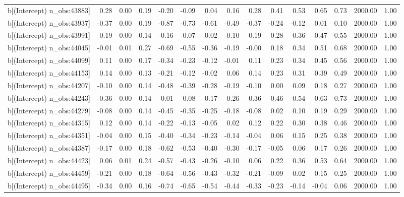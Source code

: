 \begin{table}[ht]
\begin{tabular}{rrrrrrrrrrrrrrr}
  b[(Intercept) n\_obs:43883] & 0.28 & 0.00 & 0.19 & -0.20 & -0.09 & 0.04 & 0.16 & 0.28 & 0.41 & 0.53 & 0.65 & 0.73 & 2000.00 & 1.00 \\ 
  b[(Intercept) n\_obs:43937] & -0.37 & 0.00 & 0.19 & -0.87 & -0.73 & -0.61 & -0.49 & -0.37 & -0.24 & -0.12 & 0.01 & 0.10 & 2000.00 & 1.00 \\ 
  b[(Intercept) n\_obs:43991] & 0.19 & 0.00 & 0.14 & -0.16 & -0.07 & 0.02 & 0.10 & 0.19 & 0.28 & 0.36 & 0.47 & 0.55 & 2000.00 & 1.00 \\ 
  b[(Intercept) n\_obs:44045] & -0.01 & 0.01 & 0.27 & -0.69 & -0.55 & -0.36 & -0.19 & -0.00 & 0.18 & 0.34 & 0.51 & 0.68 & 2000.00 & 1.00 \\ 
  b[(Intercept) n\_obs:44099] & 0.11 & 0.00 & 0.17 & -0.34 & -0.23 & -0.12 & -0.01 & 0.11 & 0.23 & 0.34 & 0.45 & 0.56 & 2000.00 & 1.00 \\ 
  b[(Intercept) n\_obs:44153] & 0.14 & 0.00 & 0.13 & -0.21 & -0.12 & -0.02 & 0.06 & 0.14 & 0.23 & 0.31 & 0.39 & 0.49 & 2000.00 & 1.00 \\ 
  b[(Intercept) n\_obs:44207] & -0.10 & 0.00 & 0.14 & -0.48 & -0.39 & -0.28 & -0.19 & -0.10 & 0.00 & 0.09 & 0.18 & 0.27 & 2000.00 & 1.00 \\ 
  b[(Intercept) n\_obs:44243] & 0.36 & 0.00 & 0.14 & 0.01 & 0.08 & 0.17 & 0.26 & 0.36 & 0.46 & 0.54 & 0.63 & 0.73 & 2000.00 & 1.00 \\ 
  b[(Intercept) n\_obs:44279] & -0.08 & 0.00 & 0.14 & -0.45 & -0.35 & -0.25 & -0.18 & -0.08 & 0.02 & 0.10 & 0.19 & 0.29 & 2000.00 & 1.00 \\ 
  b[(Intercept) n\_obs:44315] & 0.12 & 0.00 & 0.14 & -0.22 & -0.13 & -0.05 & 0.02 & 0.12 & 0.22 & 0.30 & 0.38 & 0.46 & 2000.00 & 1.00 \\ 
  b[(Intercept) n\_obs:44351] & -0.04 & 0.00 & 0.15 & -0.40 & -0.34 & -0.23 & -0.14 & -0.04 & 0.06 & 0.15 & 0.25 & 0.38 & 2000.00 & 1.00 \\ 
  b[(Intercept) n\_obs:44387] & -0.17 & 0.00 & 0.18 & -0.62 & -0.53 & -0.40 & -0.30 & -0.17 & -0.05 & 0.06 & 0.17 & 0.26 & 2000.00 & 1.00 \\ 
  b[(Intercept) n\_obs:44423] & 0.06 & 0.01 & 0.24 & -0.57 & -0.43 & -0.26 & -0.10 & 0.06 & 0.22 & 0.36 & 0.53 & 0.64 & 2000.00 & 1.00 \\ 
  b[(Intercept) n\_obs:44459] & -0.21 & 0.00 & 0.18 & -0.64 & -0.56 & -0.43 & -0.32 & -0.21 & -0.09 & 0.02 & 0.15 & 0.25 & 2000.00 & 1.00 \\ 
  b[(Intercept) n\_obs:44495] & -0.34 & 0.00 & 0.16 & -0.74 & -0.65 & -0.54 & -0.44 & -0.33 & -0.23 & -0.14 & -0.04 & 0.06 & 2000.00 & 1.00 \\ 

\end{tabular}
\end{table}
